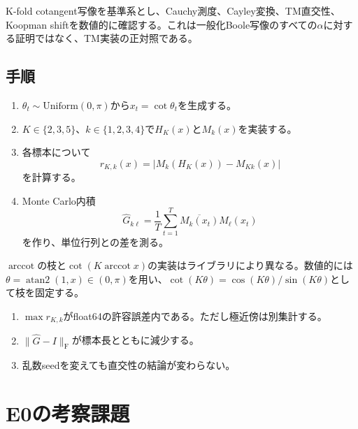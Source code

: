 \documentclass[a4paper,11pt,oneside,openany]{ltjsbook}
\begin{document}
K-fold cotangent写像を基準系とし、Cauchy測度、Cayley変換、TM直交性、Koopman shiftを数値的に確認する。これは一般化Boole写像のすべての\(\alpha\)に対する証明ではなく、TM実装の正対照である。

\subsection{手順}

\begin{enumerate}
  \item \(\theta_t\sim\mathrm{Uniform}(0,\pi)\)から\(x_t=\cot\theta_t\)を生成する。
  \item \(K\in\{2,3,5\}\)、\(k\in\{1,2,3,4\}\)で\(H_K(x)\)と\(M_k(x)\)を実装する。
  \item 各標本について
  \begin{equation}
    r_{K,k}(x)
    =\left|M_k(H_K(x))-M_{Kk}(x)\right|
    \label{eq:tm_shift_residual}
  \end{equation}
  を計算する。
  \item Monte Carlo内積
  \begin{equation}
    \widehat G_{k\ell}
    =\frac1T\sum_{t=1}^{T}\overline{M_k(x_t)}M_\ell(x_t)
    \label{eq:tm_gram_empirical}
  \end{equation}
  を作り、単位行列との差を測る。
\end{enumerate}

\begin{cautionbox}
\(\operatorname{arccot}\)の枝と\(\cot(K\operatorname{arccot}x)\)の実装はライブラリにより異なる。数値的には\(\theta=\operatorname{atan2}(1,x)\in(0,\pi)\)を用い、\(\cot(K\theta)=\cos(K\theta)/\sin(K\theta)\)として枝を固定する。
\end{cautionbox}

\begin{gatebox}
\begin{enumerate}
  \item \(\max r_{K,k}\)がfloat64の許容誤差内である。ただし極近傍は別集計する。
  \item \(\|\widehat G-I\|_{\mathrm{F}}\)が標本長とともに減少する。
  \item 乱数seedを変えても直交性の結論が変わらない。
\end{enumerate}
\end{gatebox}

\section{E0の考察課題}
\end{document}
